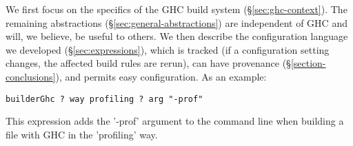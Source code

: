 
We first focus on the specifics of the GHC build system
(\S\ref{sec:ghc-context}). The remaining abstractions
(\S\ref{sec:general-abstractions}) are independent of GHC and will,
we believe, be useful to others. We then describe the configuration language we
developed (\S\ref{sec:expressions}), which is tracked (if a configuration
setting changes, the affected build rules are rerun), can have provenance
(\S\ref{section-conclusions}), and permits easy configuration. As an example:

\begin{lstlisting}
builderGhc ? way profiling ? arg "-prof"
\end{lstlisting}

\noindent This expression adds the \lst'-prof' argument to the command line when
building a file with GHC in the \lst'profiling' way.


\newcommand{\itab}[1]{\hspace{0em}\rlap{#1}}
\newcommand{\tab}[1]{\hspace{.1\textwidth}\rlap{#1}}
\newcommand{\ctab}[1]{\hspace{.031\textwidth}\rlap{#1}}
\newcommand{\ptab}[1]{\hspace{.074\textwidth}\rlap{#1}}
\newcommand{\cotab}[1]{\hspace{.064\textwidth}\rlap{#1}}
\newcommand{\ttab}[1]{\hspace{.058\textwidth}\rlap{#1}}
\newcommand{\tytab}[1]{\hspace{.103\textwidth}\rlap{#1}}
\newcommand{\atab}[1]{\hspace{.102\textwidth}\rlap{#1}}

